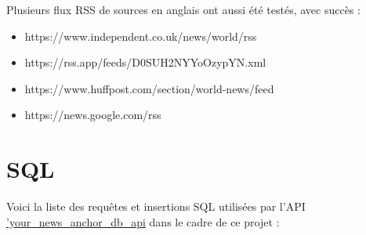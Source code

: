 \documentclass[french]{article}
\begin{document}
    Plusieurs flux RSS de sources en anglais ont aussi été testés, avec succès :
    \begin{itemize}
        \item https://www.independent.co.uk/news/world/rss
        \item https://rss.app/feeds/D0SUH2NYYoOzypYN.xml
        \item https://www.huffpost.com/section/world-news/feed
        \item https://news.google.com/rss
    \end{itemize}
    \section*{SQL}
    \label{sec:sql}
    Voici la liste des requêtes et insertions SQL utilisées par l'API \href{}{'your\_news\_anchor\_db\_api} dans le cadre de ce projet :
\end{document}
